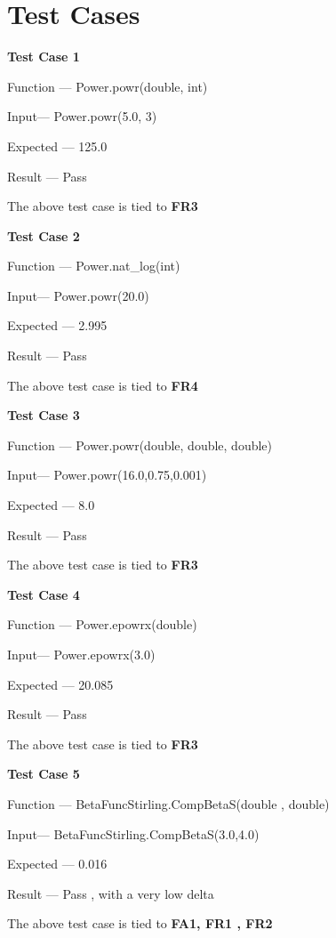 \documentclass[12pt,letterpaper]{article}
\begin{document}
\section*{Test Cases}

\textbf{Test Case 1}

Function --- Power.powr(double, int)

Input--- Power.powr(5.0, 3)

Expected --- 125.0

Result --- Pass

The above test case is tied to \textbf{FR3} \newline

\textbf{Test Case 2}

Function --- Power.nat\_log(int)

Input--- Power.powr(20.0)

Expected --- 2.995

Result --- Pass

The above test case is tied to \textbf{FR4} \newline

\textbf{Test Case 3}

Function --- Power.powr(double, double, double)

Input--- Power.powr(16.0,0.75,0.001)

Expected --- 8.0

Result --- Pass

The above test case is tied to \textbf{FR3} \newline

\textbf{Test Case 4}

Function --- Power.epowrx(double)

Input--- Power.epowrx(3.0)

Expected --- 20.085

Result --- Pass

The above test case is tied to \textbf{FR3} \newline


\textbf{Test Case 5}

Function --- BetaFuncStirling.CompBetaS(double , double)

Input--- BetaFuncStirling.CompBetaS(3.0,4.0)

Expected --- 0.016

Result --- Pass , with a very low delta

The above test case is tied to \textbf{FA1, FR1 , FR2}  \newline
\end{document}
